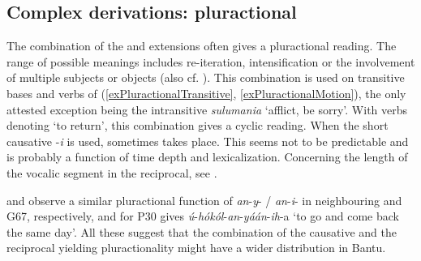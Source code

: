 \subsection{Complex derivations: pluractional}\label{Pluractional}
The combination of the  and  extensions often gives a pluractional reading. The range of possible meanings includes re-iteration, intensification or the involvement of multiple subjects or objects (also cf. \citealt[79]{SchumannK1899}). This combination is used on transitive bases and verbs of  (\ref{exPluractionalTransitive}, \ref{exPluractionalMotion}), the only attested exception being the intransitive \textit{sulumania} `afflict, be sorry'. With verbs denoting `to return', this combination gives a cyclic reading. When the short causative -\textit{i} is used, sometimes  takes place. This seems not to be predictable and is probably a function of time depth and lexicalization. Concerning the length of the vocalic segment in the reciprocal, see .


\citet[86]{BotneR2008} and \citet{GrayMS} observe a similar pluractional function of \mbox{\textit{an}-\textit{y}-} / \mbox{\textit{an}-\textit{i}-} in neighbouring  and  G67, respectively, and \citet[557]{KisseberthC2003} for  P30 gives \textit{ú}-\textit{hókól}-\textit{an}-\textit{yáán}-\textit{ih}-a `to go and come back the same day'. All these suggest that the combination of the causative and the reciprocal yielding pluractionality might have a wider distribution in Bantu. 

